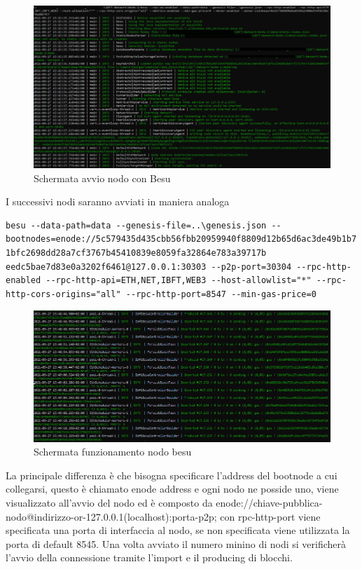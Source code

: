 \documentclass[11pt,a4paper,titlepage]{report}
\begin{document}
\begin{figure}[h]
	\includegraphics[width=\textwidth]{Besu-avvio}
	\centering
	\caption{Schermata avvio nodo con Besu}
	\label{fig:sch-avvio-besu}
\end{figure}

I successivi nodi saranno avviati in maniera analoga
\begin{lstlisting}[language=command.com]
besu --data-path=data --genesis-file=..\genesis.json --bootnodes=enode://5c579435d435cbb56fbb20959940f8809d12b65d6ac3de49b1b7 1bfc2698dd28a7cf3767b45410839e8059fa32864e783a39717b eedc5bae7d83e0a3202f6461@127.0.0.1:30303 --p2p-port=30304 --rpc-http-enabled --rpc-http-api=ETH,NET,IBFT,WEB3 --host-allowlist="*" --rpc-http-cors-origins="all" --rpc-http-port=8547 --min-gas-price=0
\end{lstlisting}

\begin{figure}[h]
	\includegraphics[width=\textwidth]{Besu-imported-produced}
	\centering
	\caption{Schermata funzionamento nodo besu}
	\label{fig:besu-imported-produced}
\end{figure}

La principale differenza è che bisogna specificare l'address del bootnode a cui collegarsi, questo è chiamato enode address e ogni nodo ne posside uno, viene visualizzato all'avvio del nodo ed è composto da 
enode://chiave-pubblica-nodo@indirizzo-or-127.0.0.1(localhost):porta-p2p; con rpc-http-port viene specificata una porta di interfaccia al nodo, se non specificata viene utilizzata la porta di default 8545. Una volta avviato il numero minino di nodi si verificherà l'avvio della connessione tramite l'import e il producing di blocchi.
\end{document}
